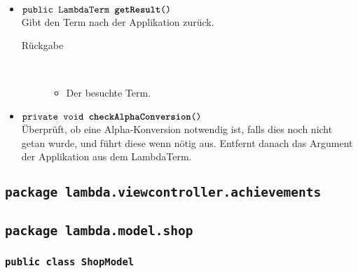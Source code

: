 \begin{description}
\begin{itemize}
		\item $\texttt{public LambdaTerm \textbf{getResult}()}$ \\ Gibt den Term nach der Applikation zurück.
		\begin{description}
			\item[Rückgabe] \hfill \\
			\vspace{-.8cm}
			\begin{itemize}
				\item Der besuchte Term.
			\end{itemize}
		\end{description}
		
		\item $\texttt{private void \textbf{checkAlphaConversion}()}$ \\ Überprüft, ob eine Alpha-Konversion notwendig ist, falls dies noch nicht getan wurde, und führt diese wenn nötig aus. Entfernt danach das Argument der Applikation aus dem LambdaTerm.
	\end{itemize}
\end{description}










\subsection{\texttt{package lambda.viewcontroller.achievements}}





\subsection{\texttt{package lambda.model.shop}}

\subsubsection{\normalfont \texttt{public class \textbf{ShopModel}}}

